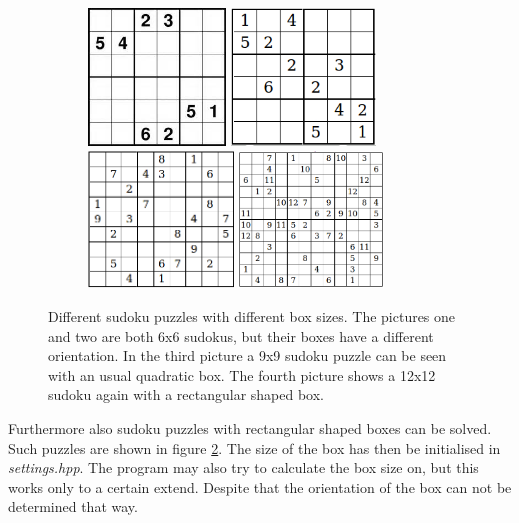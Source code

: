 \documentclass[
a4paper,     %
12pt         %
]{scrartcl}  %
\begin{document}
\begin{figure}[h!btp]
   \begin{center}
     \begin{subfigure}[b]{\linewidth}
       \includegraphics[height=3.65cm]{imgs/6x6up.png}\label{fig:j}
       \includegraphics[height=3.65cm]{imgs/solver_6x6.png}\label{fig:k}
       \includegraphics[height=3.65cm]{imgs/solver_9x9.png}\label{fig:l}
       \includegraphics[height=3.65cm]{imgs/solver_12x12.png}\label{fig:m}
     \end{subfigure}
        \caption[Different sudoku puzzles with different box sizes]{\scriptsize{Different sudoku puzzles with different box sizes.
         The pictures one and two are both 6x6 sudokus, but their boxes have a different orientation. In the third picture a
         9x9 sudoku puzzle can be seen with an usual quadratic box. The fourth picture shows a 12x12 sudoku again with a rectangular
         shaped box.}}
     \label{fig:boxshapes}
   \end{center}
\end{figure} 
Furthermore also sudoku puzzles with rectangular shaped boxes can be solved. Such puzzles are shown in figure \ref{fig:boxshapes}.
The size of the box has then be initialised in \emph{settings.hpp}. The program may also try to calculate the box size on, but this works only to a certain extend. Despite that
the orientation of the box can not be determined that way.
\end{document}

